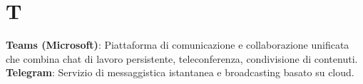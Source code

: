 \section{T}
\textbf{Teams (Microsoft)}: Piattaforma di comunicazione e collaborazione unificata che combina chat di lavoro persistente, teleconferenza, condivisione di contenuti.\\
\textbf{Telegram}: Servizio di messaggistica istantanea e broadcasting basato su cloud.\\
